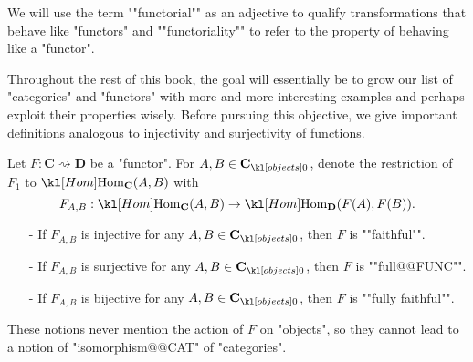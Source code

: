 \documentclass[main.tex]{subfiles}
\begin{document}
\begin{rem}[Functoriality]
	\AP We will use the term ""functorial"" as an adjective to qualify transformations that behave like "functors" and ""functoriality"" to refer to the property of behaving like a "functor".
\end{rem}
Throughout the rest of this book, the goal will essentially be to grow our list of "categories" and "functors" with more and more interesting examples and perhaps exploit their properties wisely. Before pursuing this objective, we give important definitions analogous to injectivity and surjectivity of functions.
\begin{defn}
	Let $F:\mathbf{C} \rightsquigarrow \mathbf{D}$ be a "functor". For $A,B \in \obj{\mathbf{C}}$, denote the restriction of $F_1$ to $\Hom_{\mathbf{C}}(A,B)$ with \[F_{A,B}:\Hom_{\mathbf{C}}(A,B) \rightarrow \Hom_{\mathbf{D}}(F(A), F(B)).\]
	\begin{itemize}
		\item[-] If $F_{A,B}$ is injective for any $A,B \in \obj{\mathbf{C}}$, then $F$ is ""faithful"".
		\item[-] If $F_{A,B}$ is surjective for any $A,B \in \obj{\mathbf{C}}$, then $F$ is ""full@@FUNC"".
		\item[-] If $F_{A,B}$ is bijective for any $A,B \in \obj{\mathbf{C}}$, then $F$ is ""fully faithful"".
	\end{itemize}    
\end{defn}
\begin{rem}%
These notions never mention the action of $F$ on "objects", so they cannot lead to a notion of "isomorphism@@CAT" of "categories".
\end{rem}
\end{document}
